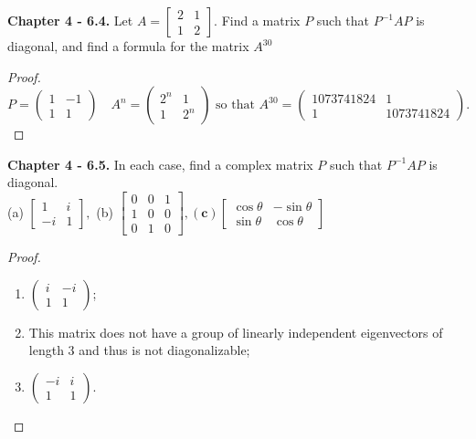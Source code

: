 \documentclass[10pt]{report}
\theoremstyle{definition}
\begin{document}
\textbf{Chapter 4 - 6.4.} Let $A=\left[\begin{array}{ll}{2} & {1} \\ {1} & {2}\end{array}\right] .$ Find a matrix $P$ such that $P^{-1} A P$ is diagonal, and find a formula for the matrix $A^{30}$
\begin{proof}
$$
P=\begin{pmatrix}1&-1\\1&1\end{pmatrix}\quad A^{n}=\begin{pmatrix}2^n&1\\1&2^n\end{pmatrix}\text{ so that }A^{30}=\begin{pmatrix}1073741824&1\\1&1073741824\end{pmatrix}.
$$
\end{proof}

\textbf{Chapter 4 - 6.5.} In each case, find a complex matrix $P$ such that $P^{-1} A P$ is diagonal.\\
(a) $\left[\begin{array}{cc}{1} & {i} \\ {-i} & {1}\end{array}\right],$ (b) $\left[\begin{array}{lll}{0} & {0} & {1} \\ {1} & {0} & {0} \\ {0} & {1} & {0}\end{array}\right],(\mathbf{c})\left[\begin{array}{cc}{\cos \theta} & {-\sin \theta} \\ {\sin \theta} & {\cos \theta}\end{array}\right]$
\begin{proof}{}\leavevmode{}
\begin{enumerate}[label=(\alph*)]
\item $
\begin{pmatrix}
i&-i\\1&1
\end{pmatrix}
$;
\item
This matrix does not have a group of linearly independent eigenvectors of length $3$ and thus is not diagonalizable;
\item $
\begin{pmatrix}
-i&i\\1&1
\end{pmatrix}
$.
\end{enumerate}
\end{proof}
\end{document}
